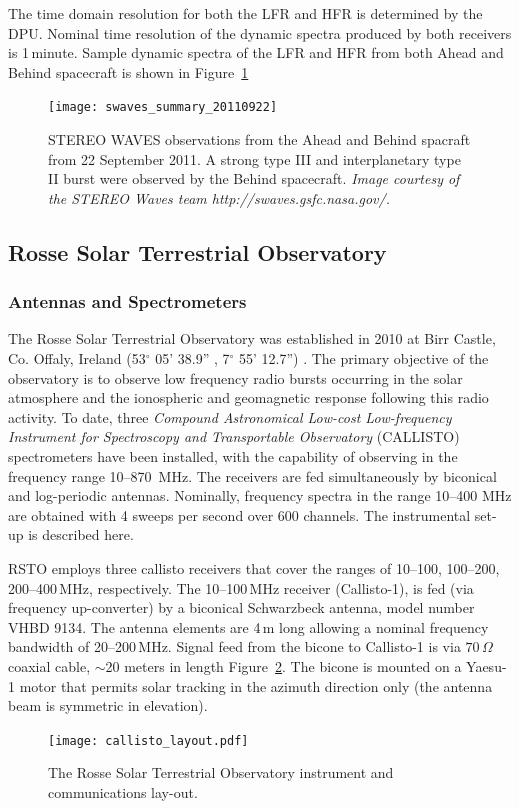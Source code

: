 The time domain resolution for both the LFR and HFR is determined by the DPU. Nominal time resolution of the dynamic spectra produced by both receivers is 1\,minute. Sample dynamic spectra of the LFR and HFR from both Ahead and Behind spacecraft is shown in Figure~\ref{fig:swaves_antennas}
\begin{figure}
\centering
\texttt{[image: swaves\_summary\_20110922]}
\caption[STEREO WAVES observations]{STEREO WAVES observations from the Ahead and Behind spacraft from 22 September 2011. A strong type III and interplanetary type II burst were observed by the Behind spacecraft. {\it Image courtesy of the STEREO Waves team http://swaves.gsfc.nasa.gov/.}}
\label{fig:swaves_antennas}
\end{figure}


\subsection{Rosse Solar Terrestrial Observatory}\label{sec:30}

\subsubsection{Antennas and Spectrometers}
The Rosse Solar Terrestrial Observatory was established in 2010 at Birr Castle, Co. Offaly, Ireland (53$^{\circ}$ 05' 38.9'' , 7$^{\circ}$ 55' 12.7'') \citep{zucca2012}. The primary objective of the observatory is to observe low frequency radio bursts occurring in the solar atmosphere and the ionospheric and geomagnetic response following this radio activity.  To date, three \textit{Compound Astronomical Low-cost Low-frequency Instrument for Spectroscopy and Transportable Observatory} (CALLISTO) spectrometers have been installed, with the capability of observing in the frequency range 10--870~MHz. The receivers are fed simultaneously by biconical and log-periodic antennas. Nominally, frequency spectra in the range 10--400 MHz are obtained with 4 sweeps per second over 600 channels. The instrumental set-up is described here.

RSTO employs three callisto receivers that cover the ranges of 10--100, 100--200, 200--400\,MHz, respectively. The 10--100\,MHz receiver (Callisto-1), is fed (via frequency up-converter) by a biconical Schwarzbeck antenna, model number VHBD 9134. The antenna elements are 4\,m long allowing a nominal frequency bandwidth of 20--200\,MHz. Signal feed from the bicone to Callisto-1 is via $70\,\Omega$ coaxial cable, $\sim$20 meters in length Figure~\ref{fig:rsto_layout}. The bicone is mounted on a Yaesu-1 motor that permits solar tracking in the azimuth direction only (the antenna beam is symmetric in elevation). 
\begin{figure}
    \centering
\texttt{[image: callisto\_layout.pdf]}
\caption[RSTO Instrumental Setup]{The Rosse Solar Terrestrial Observatory instrument and communications lay-out.}
\label{fig:rsto_layout}
\end{figure}

